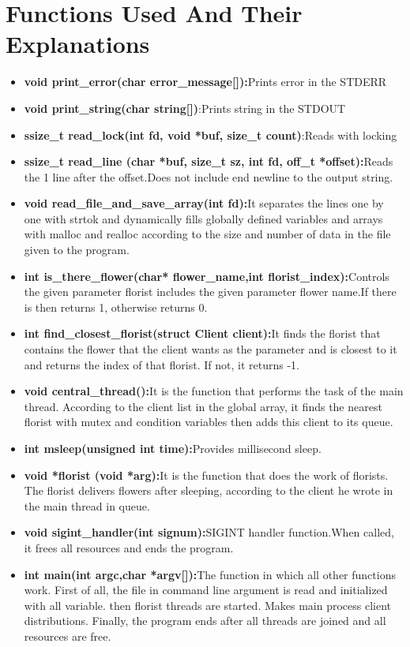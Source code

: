 \documentclass{article}
\begin{document}
\section{Functions Used And Their Explanations}
\begin{itemize}
    \item \textbf{void print\_error(char error\_message[]):}Prints error in the STDERR
    \item \textbf{void print\_string(char string[])}:Prints string in the STDOUT
    \item \textbf{ssize\_t read\_lock(int fd, void *buf, size\_t count)}:Reads with locking
    \item \textbf{ssize\_t read\_line (char *buf, size\_t sz, int fd, off\_t *offset):}Reads the 1 line after the offset.Does not include end newline to the output string.
    \item \textbf{void read\_file\_and\_save\_array(int fd):}It separates the lines one by one with strtok and dynamically fills globally defined variables and arrays with malloc and realloc according to the size and number of data in the file given to the program.
    \item \textbf{int is\_there\_flower(char* flower\_name,int florist\_index):}Controls the given parameter florist includes the given parameter flower name.If there is then returns 1, otherwise returns 0.
    \item \textbf{int find\_closest\_florist(struct Client client):}It finds the florist that contains the flower that the client wants as the parameter and is closest to it and returns the index of that florist. If not, it returns -1.
    \item \textbf{void central\_thread():}It is the function that performs the task of the main thread. According to the client list in the global array, it finds the nearest florist with mutex and condition variables then adds this client to its queue.
    \item \textbf{int msleep(unsigned int time):}Provides millisecond sleep.
    \item \textbf{void *florist (void *arg):}It is the function that does the work of florists. The florist delivers flowers after sleeping, according to the client he wrote in the main thread in queue.
    \item \textbf{void sigint\_handler(int signum):}SIGINT handler function.When called, it frees all resources and ends the program.
    \item \textbf{int main(int argc,char *argv[]):}The function in which all other functions work. First of all, the file in command line argument is read and initialized with all variable. then florist threads are started. Makes main process client distributions. Finally, the program ends after all threads are joined and all resources are free.
\end{itemize}
\end{document}
